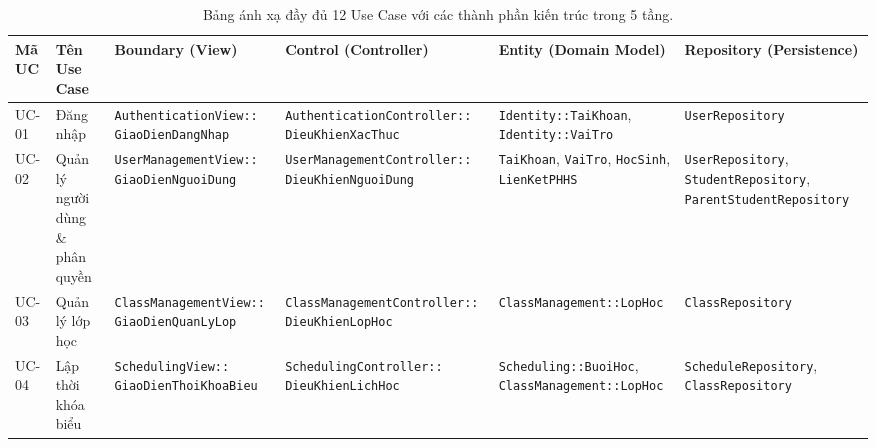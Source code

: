 \documentclass[11pt,a4paper]{report}
\begin{document}
\clearpage
\begin{landscape}
\begin{table}[p]
  \centering
  \caption{Bảng ánh xạ đầy đủ 12 Use Case với các thành phần kiến trúc trong 5 tầng.}
  \label{tab:uc_mapping}
  \fontsize{7.8pt}{9.6pt}\selectfont
  \renewcommand{\arraystretch}{1.2}
  \begin{tabularx}{\linewidth}{@{}l >{\raggedright\arraybackslash}p{3.2cm} >{\raggedright\arraybackslash}p{4.2cm} >{\raggedright\arraybackslash}p{4.6cm} >{\raggedright\arraybackslash}p{4.8cm} >{\raggedright\arraybackslash}X@{}}
    \toprule
    \textbf{Mã UC} & \textbf{Tên Use Case} & \textbf{Boundary (View)} & \textbf{Control (Controller)} & \textbf{Entity (Domain Model)} & \textbf{Repository (Persistence)} \\
    \midrule
    UC-01 & Đăng nhập & \texttt{AuthenticationView::} \newline \texttt{GiaoDienDangNhap} & \texttt{AuthenticationController::} \newline \texttt{DieuKhienXacThuc} & \texttt{Identity::TaiKhoan}, \newline \texttt{Identity::VaiTro} & \texttt{UserRepository} \\
    UC-02 & Quản lý người dùng \& phân quyền & \texttt{UserManagementView::} \newline \texttt{GiaoDienNguoiDung} & \texttt{UserManagementController::} \newline \texttt{DieuKhienNguoiDung} & \texttt{TaiKhoan}, \texttt{VaiTro}, \newline \texttt{HocSinh}, \texttt{LienKetPHHS} & \texttt{UserRepository}, \newline \texttt{StudentRepository}, \newline \texttt{ParentStudentRepository} \\
    UC-03 & Quản lý lớp học & \texttt{ClassManagementView::} \newline \texttt{GiaoDienQuanLyLop} & \texttt{ClassManagementController::} \newline \texttt{DieuKhienLopHoc} & \texttt{ClassManagement::LopHoc} & \texttt{ClassRepository} \\
    UC-04 & Lập thời khóa biểu & \texttt{SchedulingView::} \newline \texttt{GiaoDienThoiKhoaBieu} & \texttt{SchedulingController::} \newline \texttt{DieuKhienLichHoc} & \texttt{Scheduling::BuoiHoc}, \newline \texttt{ClassManagement::LopHoc} & \texttt{ScheduleRepository}, \newline \texttt{ClassRepository} \\

\end{tabularx}
\end{table}
\end{landscape}
\end{document}
